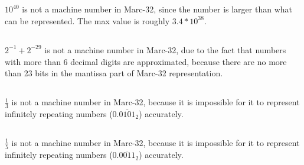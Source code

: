 \subsection{}
$10^{40}$ is not a machine number in Marc-32, since the number is larger than what can be represented. The max value is roughly $3.4*10^{38}$.

\subsection{}
$2^{-1}+2^{-29}$ is not a machine number in Marc-32, due to the fact that numbers with more than 6 decimal digits are approximated, because there are no more than 23 bits in the mantissa part of Marc-32 representation.

\subsection{}
$\frac{1}{3}$ is not a machine number in Marc-32, because it is impossible for it to represent infinitely repeating numbers ($0.\overline{0101}_2$) accurately.

\subsection{}
$\frac{1}{5}$ is not a machine number in Marc-32, because it is impossible for it to represent infinitely repeating numbers ($0.\overline{0011}_2$) accurately.
